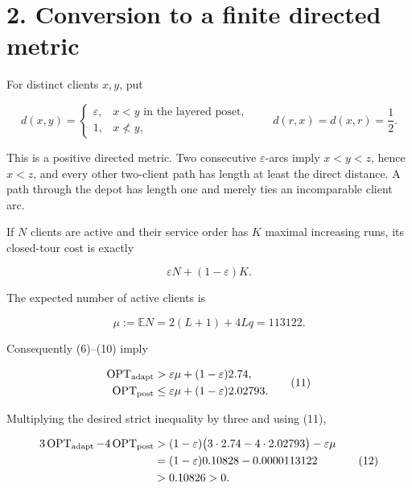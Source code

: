 \documentclass[11pt,a4paper]{article}
\begin{document}
\section*{2. Conversion to a finite directed metric}

For distinct clients \(x,y\), put


\begin{equation}
 d(x,y)=
 \begin{cases}
   \varepsilon,&x<y\text{ in the layered poset},\\
   1,&x\not<y,
 \end{cases}
\qquad
 d(r,x)=d(x,r)=\frac12.
\tag{8}
\end{equation}

This is a positive directed metric.  Two consecutive \(\varepsilon\)-arcs imply \(x<y<z\), hence \(x<z\), and every other two-client path has length at least the direct distance.  A path through the depot has length one and merely ties an incomparable client arc.


If \(N\) clients are active and their service order has \(K\) maximal increasing runs, its closed-tour cost is exactly


\begin{equation}
              \varepsilon N+(1-\varepsilon)K.
\tag{9}
\end{equation}

The expected number of active clients is


\begin{equation}
 \mu:=\mathbb EN
 =2(L+1)+4Lq
 =113122.
\tag{10}
\end{equation}

Consequently (6)--(10) imply


\begin{equation}
\begin{aligned}
 \operatorname{OPT}_{\rm adapt}
  &>\varepsilon\mu+(1-\varepsilon)2.74,\\
 \operatorname{OPT}_{\rm post}
  &\le\varepsilon\mu+(1-\varepsilon)2.02793.
\end{aligned}
\tag{11}
\end{equation}

Multiplying the desired strict inequality by three and using (11),


\begin{equation}
\begin{aligned}
 3\operatorname{OPT}_{\rm adapt}
 -4\operatorname{OPT}_{\rm post}
 &>
 (1-\varepsilon)
   \bigl(3\cdot2.74-4\cdot2.02793\bigr)
 -\varepsilon\mu\\
 &=(1-\varepsilon)0.10828-0.0000113122\\
 &>0.10826>0.
\end{aligned}
\tag{12}
\end{equation}
\end{document}

